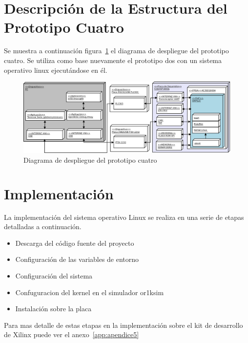 		\newpage
		
		\section{Descripción de la Estructura del Prototipo Cuatro}
		Se muestra a continuación figura~\ref{fig:proto4} el diagrama de despliegue del prototipo cuatro. Se utiliza como base nuevamente el prototipo
		dos con un sistema operativo linux ejecutándose en él.

		\begin{figure}[h!]
 		\begin{center}
  		\includegraphics[width=1\textwidth,keepaspectratio=true]{./images/proto4}
  		\caption{Diagrama de despliegue del prototipo cuatro}
  		\label{fig:proto4} 
 		\end{center}
		\end{figure}
	
		\section{Implementación}	
		
La implementación del sistema operativo Linux se realiza en una serie de etapas detalladas a continuación. 
		\begin {itemize}
		\item Descarga del código fuente del proyecto
		\item Configuración de las variables de entorno
		\item Configuración del sistema
		\item Confuguracion del kernel en el simulador or1ksim
		\item Instalación sobre la placa 
		\end {itemize}

Para mas detalle de estas etapas en la implementación sobre el kit de desarrollo de Xilinx puede ver el anexo~\ref{app:apendice5}
 
		\newpage
				
